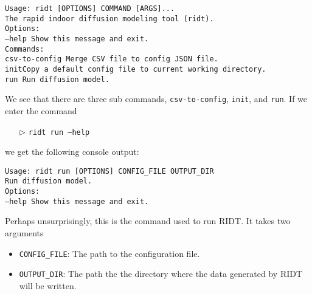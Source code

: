 \documentclass[]{article}
\def\code#1{\texttt{#1}}
\def\HS{\hspace{\fontdimen2\font}}
\begin{document}
\begin{addmargin}[1.5em]{1em}
\begin{tcolorbox}[enhanced,width=6in,fontupper=\bfseries,drop shadow
southwest,sharp corners, before upper={\parindent15pt}]
\noindent\code{Usage: ridt [OPTIONS] COMMAND [ARGS]...}\\

\indent\code{The rapid indoor diffusion modeling tool (ridt).}\\

\noindent\code{Options:}\\
\indent\code{--help  Show this message and exit.}\\

\noindent\code{Commands:}\\
\indent\code{csv-to-config \HS\HS\HS\HS Merge CSV file to config JSON file.}\\
\indent\code{init\HS\HS\HS\HS\HS\HS\HS\HS\HS\HS\HS\HS\HS\HS Copy a default 
config file to current working directory.}\\
\indent\code{run \HS\HS\HS\HS\HS\HS\HS\HS\HS\HS\HS\HS\HS\HS Run diffusion model.}
\end{tcolorbox}
\end{addmargin}
\medskip

\noindent We see that there are three sub commands, \code{csv-to-config},
\code{init}, and \code{run}. If we enter the command 

\begin{itemize}
    \item[$\triangleright$] \code{ridt run --help}
\end{itemize}
we get the following console output:\\

\begin{addmargin}[1.5em]{1em}
\begin{tcolorbox}[enhanced,width=6in,fontupper=\bfseries,drop shadow
southwest,sharp corners, before upper={\parindent15pt}]
\noindent\code{Usage: ridt run [OPTIONS] CONFIG\_FILE OUTPUT\_DIR}\\

\indent\code{Run diffusion model.}\\

\noindent\code{Options:}\\
\indent\code{--help  Show this message and exit.}
\end{tcolorbox}
\end{addmargin}
\medskip

\noindent Perhaps unsurprisingly, this is the command used to run RIDT. It takes
two arguments
\begin{itemize}
    \item \code{CONFIG\_FILE}: The path to the configuration file.
    \item \code{OUTPUT\_DIR}: The path the the directory where the data
    generated by RIDT will be written.
\end{itemize}
\end{document}
